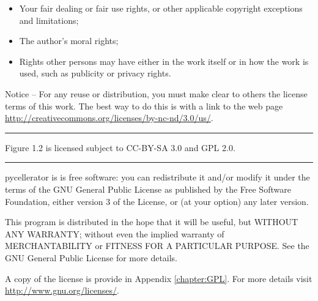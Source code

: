 \begin{small}
\begin{itemize}
\begin{itemize}
\setlength{\itemsep}{0pt}
\setlength{\parsep}{0pt}
\setlength{\topsep}{0pt}
\setlength{\parskip}{0pt}
\item Your fair dealing or fair use rights, or other applicable copyright exceptions and limitations;
\item The author's moral rights;
\item Rights other persons may have either in the work itself or in how the work is used, such as publicity or privacy rights.
\end{itemize}
\end{itemize}
\vspace{-12pt} 
Notice -- For any reuse or distribution, you must make clear to others the license terms of this work. The best way to do this is with a link to the web page \url{http://creativecommons.org/licenses/by-nc-nd/3.0/us/}. \\
\hrule
Figure 1.2 is licensed subject to CC-BY-SA 3.0 and GPL 2.0. 

\hrule 
pycellerator is is free software: you can redistribute it and/or modify
    it under the terms of the GNU General Public License as published by
    the Free Software Foundation, either version 3 of the License, or
    (at your option) any later version.

    This program is distributed in the hope that it will be useful,
    but WITHOUT ANY WARRANTY; without even the implied warranty of
    MERCHANTABILITY or FITNESS FOR A PARTICULAR PURPOSE.  See the
    GNU General Public License for more details.
    
    A copy of the license is provide in Appendix \ref{chapter:GPL}. For more details visit \url{http://www.gnu.org/licenses/}. 

\end{small}
